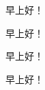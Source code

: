 \documentclass{ctexart}
\begin{document}
\noindent 早上好！

早上好！

{\tiny 早上好！}

{\Huge 早上好！}
\end{document}
